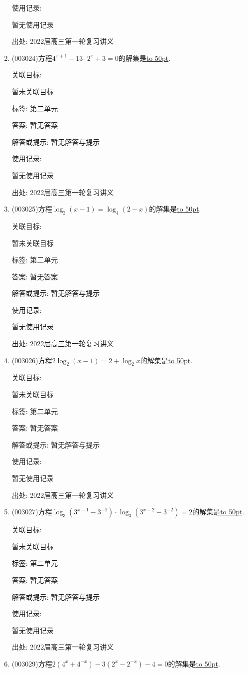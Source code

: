 \documentclass[10pt,a4paper]{article}
\newcommand{\blank}[1]{\underline{\hbox to #1pt{}}}
\begin{document}
\begin{enumerate}[1.]
使用记录:

暂无使用记录


出处: 2022届高三第一轮复习讲义
\item { (003024)}方程$4^{x+1}-13\cdot 2^x+3=0$的解集是\blank{50}.


关联目标:

暂未关联目标



标签: 第二单元

答案: 暂无答案

解答或提示: 暂无解答与提示

使用记录:

暂无使用记录


出处: 2022届高三第一轮复习讲义
\item { (003025)}方程$\log_2(x-1)=\log_4(2-x)$的解集是\blank{50}.


关联目标:

暂未关联目标



标签: 第二单元

答案: 暂无答案

解答或提示: 暂无解答与提示

使用记录:

暂无使用记录


出处: 2022届高三第一轮复习讲义
\item { (003026)}方程$2\log_2(x-1)=2+\log_2 x$的解集是\blank{50}.


关联目标:

暂未关联目标



标签: 第二单元

答案: 暂无答案

解答或提示: 暂无解答与提示

使用记录:

暂无使用记录


出处: 2022届高三第一轮复习讲义
\item { (003027)}方程$\log_3(3^{x-1}-3^{-1})\cdot \log_3(3^{x-2}-3^{-2})=2$的解集是\blank{50}.


关联目标:

暂未关联目标



标签: 第二单元

答案: 暂无答案

解答或提示: 暂无解答与提示

使用记录:

暂无使用记录


出处: 2022届高三第一轮复习讲义
\item { (003029)}方程$2(4^x+4^{-x})-3(2^x-2^{-x})-4=0$的解集是\blank{50}.



\end{enumerate}
\end{document}
